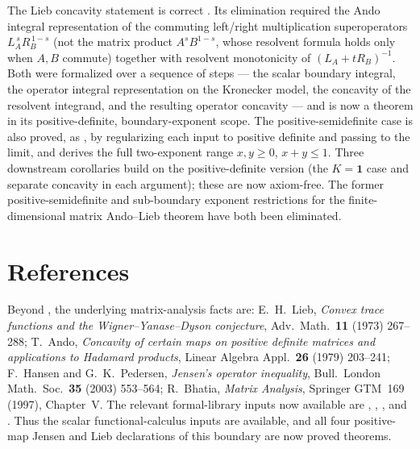 \documentclass{article}
\begin{document}
The Lieb concavity statement is correct
\cite[Theorem~5.15]{Wolf2012Quantum}.  Its elimination required the Ando
integral representation of the commuting left/right multiplication superoperators
$L_A^{\,s}R_B^{\,1-s}$ (not the matrix product $A^sB^{1-s}$, whose resolvent
formula holds only when $A,B$ commute) together with resolvent monotonicity of
$(L_A+tR_B)^{-1}$.  Both were formalized over a sequence of steps --- the scalar
boundary integral, the operator integral representation on the Kronecker model,
the concavity of the resolvent integrand, and the resulting operator concavity ---
and  is now a theorem in its positive-definite,
boundary-exponent scope.  The positive-semidefinite case is also proved, as
, by regularizing each input to positive definite and
passing to the limit, and  derives the full
two-exponent range $x,y\ge 0$, $x+y\le 1$.  Three downstream corollaries build on
the positive-definite version (the $K=\mathbf 1$ case and separate concavity in
each argument); these are now axiom-free.  The former positive-semidefinite and
sub-boundary exponent restrictions for the finite-dimensional matrix
Ando--Lieb theorem have both been eliminated.

\section*{References}

Beyond \cite{Wolf2012Quantum}, the underlying matrix-analysis facts are:
E.~H.\ Lieb, \emph{Convex trace functions and the Wigner--Yanase--Dyson
conjecture}, Adv.\ Math.\ \textbf{11} (1973) 267--288;
T.~Ando, \emph{Concavity of certain maps on positive definite matrices and
applications to Hadamard products}, Linear Algebra Appl.\ \textbf{26} (1979)
203--241;
F.~Hansen and G.~K.\ Pedersen, \emph{Jensen's operator inequality}, Bull.\
London Math.\ Soc.\ \textbf{35} (2003) 553--564;
R.~Bhatia, \emph{Matrix Analysis}, Springer GTM~169 (1997), Chapter~V.
The relevant formal-library inputs now available are
,
\leanid{CFC.concaveOn_rpow}, \leanid{CFC.convexOn_rpow}, and
.  Thus the scalar functional-calculus inputs are
available, and all four positive-map Jensen and Lieb declarations of this
boundary are now proved theorems.



\end{document}
